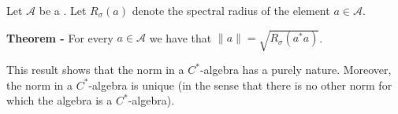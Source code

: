 \documentclass[12pt]{article}
\begin{document}
Let $\mathcal{A}$ be a . Let $R_{\sigma}(a)$ denote the spectral radius of the element $a \in \mathcal{A}$.

{\bf Theorem -} For every $a \in \mathcal{A}$ we have that $\|a\| = \sqrt{R_{\sigma}(a^*a)}$.

This result shows that the norm in a $C^*$-algebra has a purely  nature. Moreover, the norm in a $C^*$-algebra is unique (in the sense that there is no other norm for which the algebra is a $C^*$-algebra).
\end{document}
